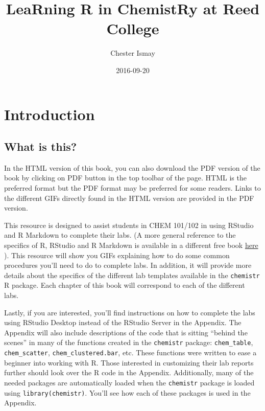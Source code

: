 \documentclass[]{tufte-book}
\title{LeaRning R in ChemistRy at Reed College}
\author{Chester Ismay}
\date{2016-09-20}
\begin{document}
\maketitle



{
\setcounter{tocdepth}{1}
\tableofcontents
}

\chapter*{Introduction}\label{introduction}

\section*{What is this?}\label{what-is-this}

In the HTML version of this book, you can also download the PDF version
of the book by clicking on PDF button in the top toolbar of the page.
HTML is the preferred format but the PDF format may be preferred for
some readers. Links to the different GIFs directly found in the HTML
version are provided in the PDF version.

This resource is designed to assist students in CHEM 101/102 in using
RStudio and R Markdown to complete their labs. (A more general reference
to the specifics of R, RStudio and R Markdown is available in a
different free book \href{http://ismayc.github.io/rbasics-book}{here}
\citep{usedtor2016}). This resource will show you GIFs explaining how to
do some common procedures you'll need to do to complete labs. In
addition, it will provide more details about the specifics of the
different lab templates available in the \texttt{chemistr} R package.
Each chapter of this book will correspond to each of the different labs.

Lastly, if you are interested, you'll find instructions on how to
complete the labs using RStudio Desktop instead of the RStudio Server in
the Appendix. The Appendix will also include descriptions of the code
that is sitting ``behind the scenes'' in many of the functions created
in the \texttt{chemistr} package: \texttt{chem\_table},
\texttt{chem\_scatter}, \texttt{chem\_clustered.bar}, etc. These
functions were written to ease a beginner into working with R. Those
interested in customizing their lab reports further should look over the
R code in the Appendix. Additionally, many of the needed packages are
automatically loaded when the \texttt{chemistr} package is loaded using
\texttt{library(chemistr)}. You'll see how each of these packages is
used in the Appendix.
\end{document}
